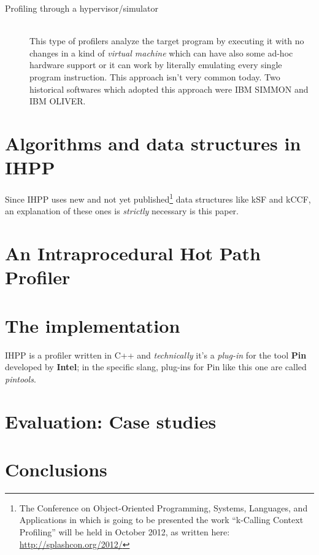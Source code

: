 \documentclass[a4paper,11pt]{report}
\begin{document}
\begin{description}
\begin{description}
\end{description} 

\item[Profiling through a hypervisor/simulator] \hfill \\
This type of profilers analyze the target program by executing it with no changes in a kind of \emph{virtual machine} which can have also some ad-hoc hardware support or it can work by literally emulating every single program instruction. This approach isn't very common today. Two historical softwares which adopted this approach were IBM SIMMON and IBM OLIVER.

\end{description}

\chapter{Algorithms and data structures in IHPP}

Since IHPP uses new and not yet published\footnote{The Conference on Object-Oriented Programming, Systems, Languages, and Applications in which is going to be presented the work ``k-Calling Context Profiling'' will be held in October 2012, as written here: \url{http://splashcon.org/2012/}} data structures like kSF and kCCF, an explanation of these ones is \emph{strictly} necessary is this paper.

\chapter{An Intraprocedural Hot Path Profiler}

\chapter{The implementation}

IHPP is a profiler written in C++ and \emph{technically} it's a \emph{plug-in} for the tool \textbf{Pin} developed by \textbf{Intel}; in the specific slang, plug-ins for Pin like this one are called \emph{pintools}.

\chapter{Evaluation: Case studies}


\chapter{Conclusions}
\end{document}
